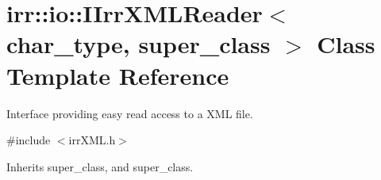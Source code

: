\hypertarget{classirr_1_1io_1_1IIrrXMLReader}{}\section{irr\+:\+:io\+:\+:I\+Irr\+X\+M\+L\+Reader$<$ char\+\_\+type, super\+\_\+class $>$ Class Template Reference}
\label{classirr_1_1io_1_1IIrrXMLReader}


Interface providing easy read access to a X\+ML file.  




{\ttfamily \#include $<$irr\+X\+M\+L.\+h$>$}



Inherits super\+\_\+class, and super\+\_\+class.

